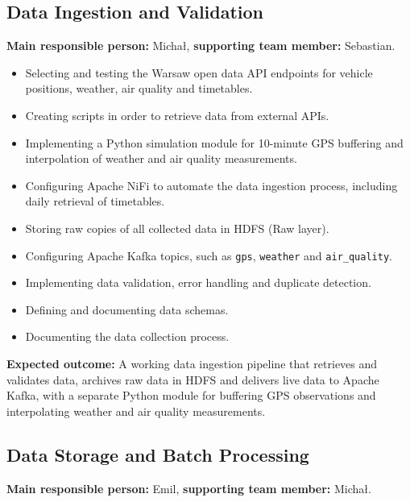 \documentclass[11pt]{article}
\begin{document}
\subsection{Data Ingestion and Validation}

\textbf{Main responsible person:} Michał, \textbf{supporting team member:} Sebastian.

\begin{itemize}
    \item Selecting and testing the Warsaw open data API endpoints for vehicle positions, weather, air quality and timetables.
    \item Creating scripts in order to retrieve data from external APIs.
    \item Implementing a Python simulation module for 10-minute GPS buffering and interpolation of weather and air quality measurements.
    \item Configuring Apache NiFi to automate the data ingestion process, including daily retrieval of timetables.
    \item Storing raw copies of all collected data in HDFS (Raw layer).
    \item Configuring Apache Kafka topics, such as \texttt{gps}, \texttt{weather} and \texttt{air\_quality}.
    \item Implementing data validation, error handling and duplicate detection.
    \item Defining and documenting data schemas.
    \item Documenting the data collection process.
\end{itemize}
\textbf{Expected outcome:} A working data ingestion pipeline that retrieves and validates data, archives raw data in HDFS and delivers live data to Apache Kafka, with a separate Python module for buffering GPS observations and interpolating weather and air quality measurements.

\subsection{Data Storage and Batch Processing}

\textbf{Main responsible person:} Emil, \textbf{supporting team member:} Michał.
\end{document}
